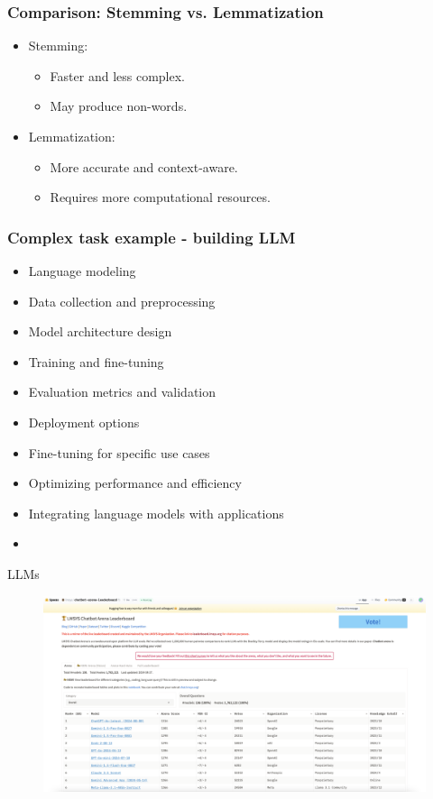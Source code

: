 \documentclass{beamer}
\begin{document}
\begin{frame}
\frametitle{Comparison: Stemming vs. Lemmatization}
\begin{itemize}
    \item Stemming:
        \begin{itemize}
            \item Faster and less complex.
            \item May produce non-words.
        \end{itemize}
    \item Lemmatization:
        \begin{itemize}
            \item More accurate and context-aware.
            \item Requires more computational resources.
        \end{itemize}
\end{itemize}
\end{frame}

\begin{frame}
\frametitle{Complex task example - building LLM}
\begin{itemize}
  \item Language modeling
  \item Data collection and preprocessing
  \item Model architecture design
  \item Training and fine-tuning
  \item Evaluation metrics and validation
  \item Deployment options
  \item Fine-tuning for specific use cases
  \item Optimizing performance and efficiency
  \item Integrating language models with applications
  \item {}
\end{itemize}
\end{frame}

\begin{frame}{LLMs}{}
    \begin{figure}
        \centering
        \includegraphics[width=1\textwidth,keepaspectratio]{images/chatbot_leaderboard}
        \label{fig:}
    \end{figure}
\end{frame}
\end{document}

